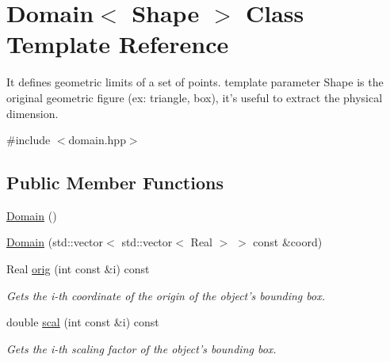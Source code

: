 \hypertarget{classDomain}{
\section{Domain$<$ Shape $>$ Class Template Reference}
\label{classDomain}
}


It defines geometric limits of a set of points. template parameter Shape is the original geometric figure (ex: triangle, box), it's useful to extract the physical dimension.  


{\ttfamily \#include $<$domain.hpp$>$}\subsection*{Public Member Functions}
\begin{DoxyCompactItemize}
\item 
\hyperlink{classDomain_a605dd094b6b53616070ae43688abe2a4}{Domain} ()
\item 
\hyperlink{classDomain_a64da121c550de1bc767ab50bf26280e1}{Domain} (std::vector$<$ std::vector$<$ Real $>$ $>$ const \&coord)
\item 
\hypertarget{classDomain_aabf4e0eff40906e1d480c606ba2b7925}{
Real \hyperlink{classDomain_aabf4e0eff40906e1d480c606ba2b7925}{orig} (int const \&i) const }
\label{classDomain_aabf4e0eff40906e1d480c606ba2b7925}

\begin{DoxyCompactList}\small\item\em Gets the i-\/th coordinate of the origin of the object's bounding box. \item\end{DoxyCompactList}\item 
\hypertarget{classDomain_accb70ed1f73f15498c050fc981df2acb}{
double \hyperlink{classDomain_accb70ed1f73f15498c050fc981df2acb}{scal} (int const \&i) const }
\label{classDomain_accb70ed1f73f15498c050fc981df2acb}

\begin{DoxyCompactList}\small\item\em Gets the i-\/th scaling factor of the object's bounding box. \item\end{DoxyCompactList}\end{DoxyCompactItemize}
